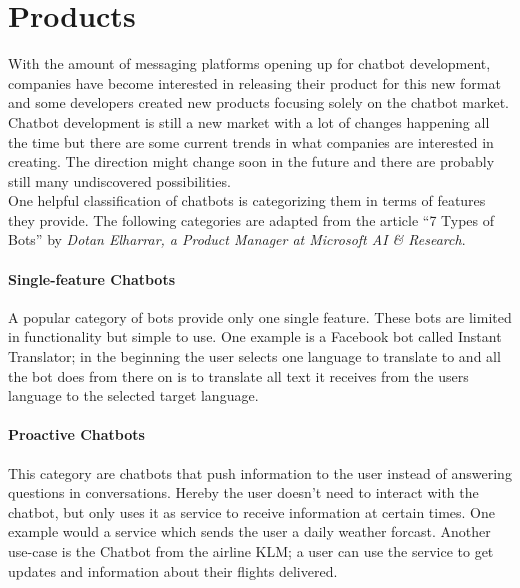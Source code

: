 \section{Products} \label{products}


With the amount of messaging platforms opening up for chatbot development, companies have become interested in releasing their product for this new format and some developers created new products focusing solely on the chatbot market.
\\

Chatbot development is still a new market with a lot of changes happening all the time but there are some current trends in what companies are interested in creating. The direction might change soon in the future and there are probably still many undiscovered possibilities.
\\

One helpful classification of chatbots is categorizing them in terms of features they provide. The following categories are adapted from the article ``7 Types of Bots'' by \emph{Dotan Elharrar, a Product Manager at Microsoft AI \& Research}\cite{bottypes}.


\paragraph{Single-feature Chatbots}

A popular category of bots provide only one single feature. These bots are limited in functionality but simple to use. One example is a Facebook bot called Instant Translator\cite{instanttranslator}; in the beginning the user selects one language to translate to and all the bot does from there on is to translate all text it receives from the users language to the selected target language.


\paragraph{Proactive Chatbots}

This category are chatbots that push information to the user instead of answering questions in conversations. Hereby the user doesn't need to interact with the chatbot, but only uses it as service to receive information at certain times. One example would a service which sends the user a daily weather forcast. Another use-case is the Chatbot from the airline KLM\cite{klm}; a user can use the service to get updates and information about their flights delivered.


